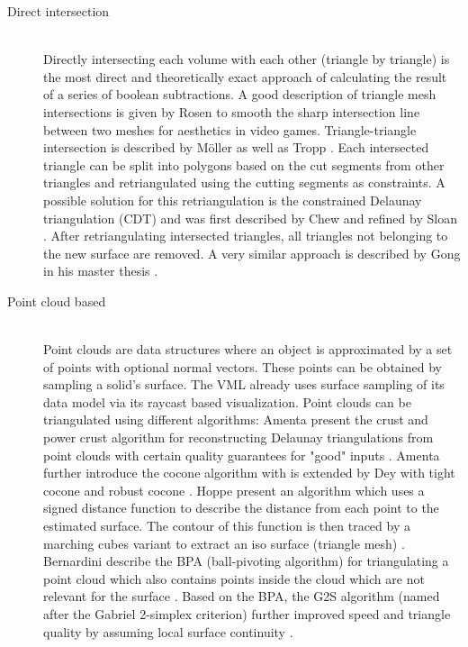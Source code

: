 \begin{description}
	
	\item[Direct intersection] \hfill \\
	Directly intersecting each volume with each other (triangle by triangle) is the most direct and theoretically exact approach of calculating the result of a series of boolean subtractions.
	A good description of triangle mesh intersections is given by Rosen to smooth the sharp intersection line between two meshes \cite{mesh_intersection} for aesthetics in video games.
	Triangle-triangle intersection is described by Möller \cite{tri_tri_intersection_moller} as well as Tropp \etal \cite{tri_tri_intersection_2}.
	Each intersected triangle can be split into polygons based on the cut segments from other triangles and retriangulated using the cutting segments as constraints.
	A possible solution for this retriangulation is the constrained Delaunay triangulation (CDT) and was first described by Chew \cite{cdt} and refined by Sloan \cite{cdt_fast}.
	After retriangulating intersected triangles, all triangles not belonging to the new surface are removed.
	A very similar approach is described by Gong in his master thesis \cite{cutter_workpiece_engagement}.
	
	
	\item[Point cloud based] \hfill \\
	Point clouds are data structures where an object is approximated by a set of points with optional normal vectors.
	These points can be obtained \eg by sampling a solid's surface.
	The VML already uses surface sampling of its data model via its raycast based visualization.
	Point clouds can be triangulated using different algorithms:
	Amenta \etal present the crust and power crust algorithm for reconstructing Delaunay triangulations from point clouds with certain quality guarantees for "good" inputs \cite{crust, power_crust}.
	Amenta \etal further introduce the cocone algorithm \cite{cocone} with is extended by Dey \etal with tight cocone \cite{tight_cocone} and robust cocone \cite{robust_cocone}.
	Hoppe \etal present an algorithm which uses a signed distance function to describe the distance from each point to the estimated surface.
	The contour of this function is then traced by a marching cubes variant to extract an iso surface (triangle mesh) \cite{sdf_surface_reconstruction}.
	Bernardini \etal describe the BPA (ball-pivoting algorithm) for triangulating a point cloud which also contains points inside the cloud which are not relevant for the surface \cite{bpa}.
	Based on the BPA, the G2S algorithm (named after the Gabriel 2-simplex criterion) further improved speed and triangle quality by assuming local surface continuity \cite{g2s}.
	

\end{description}
